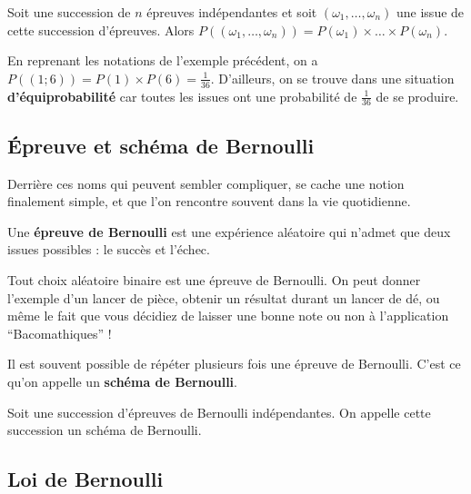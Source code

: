 	\begin{formula}
		Soit une succession de $n$ épreuves indépendantes et soit $(\omega_1, \dots, \omega_n)$ une issue de cette succession d'épreuves. Alors $P((\omega_1, \dots, \omega_n)) = P(\omega_1) \times \dots \times P(\omega_n)$.
	\end{formula}

	\begin{tip}[Exemple]
		En reprenant les notations de l'exemple précédent, on a $P((1; 6)) = P(1) \times P(6) = \frac{1}{36}$.
		\newpar
		D'ailleurs, on se trouve dans une situation \textbf{d'équiprobabilité} car toutes les issues ont une probabilité de $\frac{1}{36}$ de se produire.
	\end{tip}

	\subsection{Épreuve et schéma de Bernoulli}

	Derrière ces noms qui peuvent sembler compliquer, se cache une notion finalement simple, et que l'on rencontre souvent dans la vie quotidienne.

	\begin{formula}
		Une \textbf{épreuve de Bernoulli} est une expérience aléatoire qui n'admet que deux issues possibles : le succès et l'échec.
	\end{formula}

	\begin{tip}
		Tout choix aléatoire binaire est une épreuve de Bernoulli. On peut donner l'exemple d'un lancer de pièce, obtenir un résultat durant un lancer de dé, ou même le fait que vous décidiez de laisser une bonne note ou non à l'application ``Bacomathiques'' !
	\end{tip}

	Il est souvent possible de répéter plusieurs fois une épreuve de Bernoulli. C'est ce qu'on appelle un \textbf{schéma de Bernoulli}.

	\begin{formula}
		Soit une succession d'épreuves de Bernoulli indépendantes. On appelle cette succession un schéma de Bernoulli.
	\end{formula}

	\subsection{Loi de Bernoulli}

